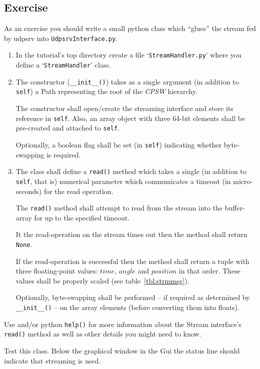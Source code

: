 \documentclass[10pt]{article}
\newcommand{\ita}[1]{\emph{#1}}
\newcommand{\cpsw}      {\ita {CPSW}}
\newcommand{\Path}      {{Path}}
\newcommand{\py}        {python}
\newcommand{\udps}      {udpsrv}
\newcommand{\cod}[1] {{\tt#1}}
\begin{document}
\subsection{Exercise}
As an exercise you should write a small \py{} class which ``glues'' the
stream fed by \udps{} into \cod{UdpsrvInterface.py}.
\begin{enumerate}
\item In the tutorial's top directory create a file `\cod{StreamHandler.py}' where you
      define a `\cod{StreamHandler}' class.
\item The constructor (\cod{\_\_init\_\_()}) takes as a single argument (in addition
      to \cod{self}) a \Path{} representing the root of the \cpsw{} hierarchy.

      The constructor shall open/create the streaming interface and store its
      reference in \cod{self}. Also, an array object with three 64-bit elements
      shall be pre-created and attached to \cod{self}.

      Optionally, a boolean flag shall be set (in \cod{self}) indicating whether
      byte-swapping is required.
\item The class shall define a \cod{read()} method which takes a single (in
      addition to \cod{self}, that is) numerical parameter which communicates
      a timeout (in micro-seconds) for the read operation.

      The \cod{read()} method shall attempt to read from the stream into
      the buffer-array for up to the specified timeout.

      It the read-operation on the stream times out then the method
      shall return \cod{None}.

      If the read-operation is successful then the method shall return a tuple with
      three floating-point values: $time$, $angle$ and $position$ in that order. 
      These values shall be properly scaled (see table~\ref{tbl:strmmsg}).

      Optionally, byte-swapping shall be performed -- if required as determined
      by \cod{\_\_init\_\_()} -- on the array elements (before converting them into
      floats).
\end{enumerate}
Use \cite{userapi} and/or \py{} \cod{help()} for more information about the Stream
interface's \cod{read()} method as well as other details you might need to know.

Test this class. Below the graphical window in the Gui the status line should indicate
that streaming is used.
\end{document}

